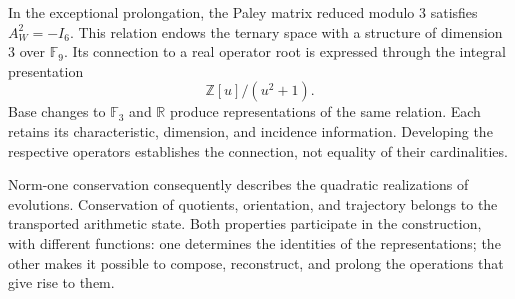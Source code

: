 In the exceptional prolongation, the Paley matrix reduced modulo \(3\)
satisfies \(A_W^2=-I_6\). This relation endows the ternary space with
a structure of dimension \(3\) over \(\mathbb F_9\). Its connection to
a real operator root is expressed through the integral presentation
\[
 \mathbb Z[u]/(u^2+1).
\]
Base changes to \(\mathbb F_3\) and \(\mathbb R\) produce representations
of the same relation. Each retains its characteristic, dimension, and
incidence information. Developing the respective operators establishes
the connection, not equality of their cardinalities.

Norm-one conservation consequently describes the quadratic realizations
of evolutions. Conservation of quotients, orientation, and trajectory
belongs to the transported arithmetic state. Both properties participate
in the construction, with different functions: one determines the identities
of the representations; the other makes it possible to compose, reconstruct,
and prolong the operations that give rise to them.
